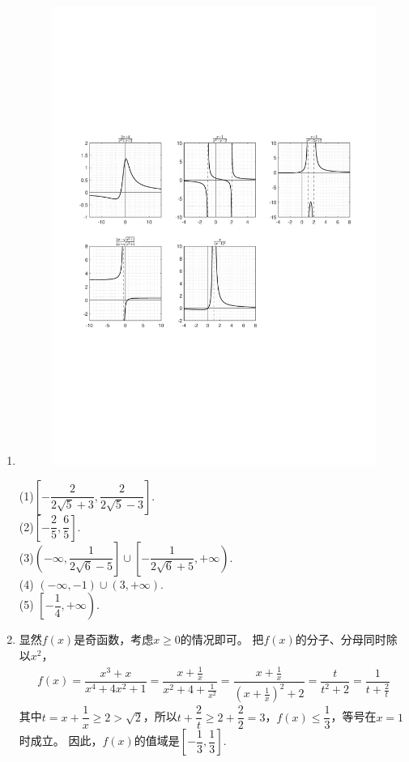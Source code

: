 \begin{enumerate}[label={\textbf{\thechapter.\arabic*}},leftmargin=
    \inteval{\myenumleftmargin}pt]
\item  %
\begin{figure}[h]
    \centering
    \includegraphics[width=0.95\linewidth]{PDF_Picture/第一章练习题中5个函数图像}
\end{figure}
(1)$ \left[-\dfrac{2}{2\sqrt{5}+3},\dfrac{2}{2\sqrt{5}-3}\right] $. \\
(2)$ \left[-\dfrac{2}{5},\dfrac{6}{5}\right] $. \\
(3)$ \left(-\infty,\dfrac{1}{2\sqrt{6}-5}\right] \cup 
\left[-\dfrac{1}{2\sqrt{6}+5},+\infty\right) $. \\
(4) $ \left(-\infty,-1\right) \cup \left(3,+\infty\right) $. \\
(5) $ \left[-\dfrac{1}{4},+\infty\right) $.

\item 显然$f(x)$是奇函数，考虑$x\geq 0$的情况即可。
把$f(x)$的分子、分母同时除以$x^2$，
\begin{gather*}
    f(x)=\dfrac{x^3+x}{x^4+4x^2+1}
    =\dfrac{x+\frac{1}{x}}{x^2+4+\frac{1}{x^2}}
    =\dfrac{x+\frac{1}{x}}{\left(x+\frac{1}{x}\right)^2+2}
    =\dfrac{t}{t^2+2}=\dfrac{1}{t+\frac{2}{t}}
\end{gather*}
其中$t=x+\dfrac{1}{x}\geq 2>\sqrt{2}$，所以$ t+\dfrac{2}{t}\geq 
2+\dfrac{2}{2}=3 $，$f(x)\leq \dfrac{1}{3}$，等号在$x=1$时成立。
因此，$f(x)$的值域是$\left[-\dfrac{1}{3},\dfrac{1}{3}\right]$.


\end{enumerate}
